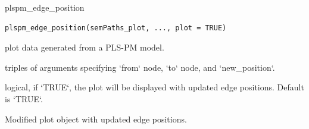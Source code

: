 \documentclass[a4paper]{book}
\begin{document}
\begin{Examples}
\end{Examples}
%
\begin{Description}
plspm\_edge\_position
\end{Description}
%
\begin{Usage}
\begin{verbatim}
plspm_edge_position(semPaths_plot, ..., plot = TRUE)
\end{verbatim}
\end{Usage}
%
\begin{Arguments}
\begin{ldescription}
\item[\code{semPaths\_plot}] plot data generated from a PLS-PM model.

\item[\code{...}] triples of arguments specifying `from` node, `to` node, and `new\_position`.

\item[\code{plot}] logical, if `TRUE`, the plot will be displayed with updated edge positions. Default is `TRUE`.
\end{ldescription}
\end{Arguments}
%
\begin{Value}
Modified plot object with updated edge positions.
\end{Value}
%
\end{document}
